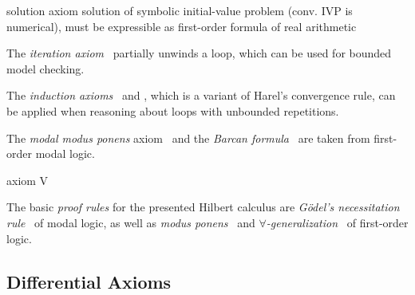     solution axiom
    solution of symbolic initial-value problem (conv. IVP is numerical), must be expressible as first-order formula of real arithmetic

    The \emph{iteration axiom}~ partially unwinds a loop, which can be used for bounded model checking.

    The \emph{induction axioms}~ and , which is a variant of Harel's convergence rule, can be applied when reasoning about loops with unbounded repetitions. 

    The \emph{modal modus ponens} axiom~ and the \emph{Barcan formula}~ are taken from first-order modal logic.

    axiom V

    The basic \emph{proof rules} for the presented Hilbert calculus are \emph{Gödel's necessitation rule}~ of modal logic, as well as \emph{modus ponens}~ and \emph{$\forall$-generalization}~ of first-order logic.


    \subsection{Differential Axioms}
        \label{sec:differential-axioms}

        \begin{calculus}
            \cinferenceRule[]{}{
                \D{} =
            }{}
            \cinferenceRule[]{}{
                \D{} =
            }{}
            \cinferenceRule[]{}{
                \D{} =
            }{}
        \end{calculus}
    
        \begin{calculus}

        
        \end{calculus}


